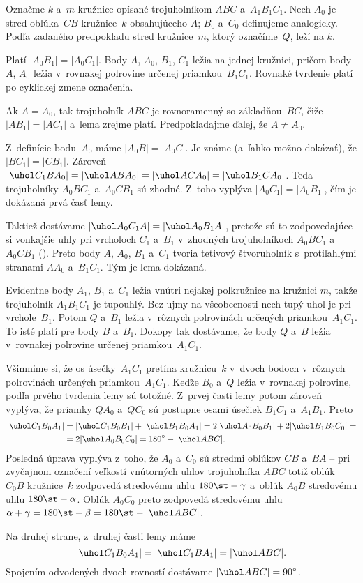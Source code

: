 {%
Označme $k$ a~$m$ kružnice opísané trojuholníkom $ABC$ a~$A_1B_1C_1$.
Nech $A_0$ je stred oblúka~$CB$ kružnice~$k$ obsahujúceho $A$; $B_0$ a~$C_0$ definujeme analogicky. Podľa zadaného predpokladu stred kružnice~$m$, ktorý označíme~$Q$, leží na $k$.

\Lema
Platí $|A_0B_1|=|A_0C_1|$. Body $A$, $A_0$, $B_1$, $C_1$ ležia na jednej kružnici, pričom body $A$, $A_0$ ležia v~rovnakej polrovine určenej priamkou~$B_1C_1$. Rovnaké tvrdenie platí po cyklickej zmene označenia.

\dokaz
Ak $A=A_0$, tak trojuholník $ABC$ je rovnoramenný so základňou~$BC$, čiže $|AB_1|=|AC_1|$ a~lema zrejme platí. Predpokladajme ďalej, že $A\ne A_0$.

Z~definície bodu~$A_0$ máme $|A_0B|=|A_0C|$. Je známe (a~ľahko možno dokázať), že $|BC_1| = |CB_1|$. Zároveň $|\uhol C_1BA_0| = |\uhol ABA_0| = |\uhol ACA_0| = |\uhol B_1CA_0|$. Teda trojuholníky $A_0BC_1$ a~$A_0CB_1$ sú zhodné. Z~toho vyplýva $|A_0C_1| = |A_0B_1|$, čím je dokázaná prvá časť lemy.

Taktiež dostávame $|\uhol A_0C_1A| = |\uhol A_0B_1A|$, pretože sú to zodpovedajúce si vonkajšie uhly pri vrcholoch $C_1$ a~$B_1$ v~zhodných trojuholníkoch $A_0BC_1$ a~$A_0CB_1$ (\obr). Preto body $A$, $A_0$, $B_1$ a~$C_1$ tvoria tetivový štvoruholník s~protiľahlými stranami $AA_0$ a~$B_1C_1$.
Tým je lema dokázaná.
%

\smallskip
Evidentne body $A_1$, $B_1$ a~$C_1$ ležia vnútri nejakej polkružnice na kružnici $m$, takže trojuholník $A_1B_1C_1$ je tupouhlý. Bez ujmy na všeobecnosti nech tupý uhol je pri vrchole~$B_1$.  Potom $Q$ a~$B_1$ ležia v~rôznych polrovinách určených priamkou~$A_1C_1$. To isté platí pre body $B$ a~$B_1$. Dokopy tak dostávame, že body $Q$ a~$B$ ležia v~rovnakej polrovine určenej priamkou~$A_1C_1$.

Všimnime si, že os úsečky~$A_1C_1$ pretína kružnicu~$k$ v~dvoch bodoch v~rôznych polrovinách určených priamkou~$A_1C_1$. Keďže $B_0$ a~$Q$ ležia v~rovnakej polrovine, podľa prvého tvrdenia lemy sú totožné. Z~prvej časti lemy potom zároveň vyplýva, že priamky $QA_0$ a~$QC_0$ sú postupne osami úsečiek $B_1C_1$ a~$A_1B_1$. Preto
$$
\aligned
|\uhol C_1B_0A_1| &= |\uhol C_1B_0B_1| + |\uhol B_1B_0A_1| = 2|\uhol A_0B_0B_1| + 2|\uhol B_1B_0C_0| = \\
& = 2|\uhol A_0B_0C_0| = 180^{\circ} - |\uhol ABC|.
\endaligned
$$
Posledná úprava vyplýva z~toho, že $A_0$ a~$C_0$ sú stredmi oblúkov $CB$ a~$BA$ -- pri zvyčajnom označení veľkostí vnútorných uhlov trojuholníka $ABC$ totiž oblúk~$C_0B$ kružnice~$k$ zodpovedá stredovému uhlu $180\st-\gamma$ a~oblúk $A_0B$ stredovému uhlu $180\st-\alpha$. Oblúk $A_0C_0$ preto zodpovedá stredovému uhlu $\alpha+\gamma=180\st-\beta=180\st - |\uhol ABC|$.

Na druhej strane, z~druhej časti lemy máme
$$
|\uhol C_1B_0A_1| = |\uhol C_1BA_1| = |\uhol ABC|.
$$
Spojením odvodených dvoch rovností dostávame $|\uhol ABC| = 90^{\circ}$.}

